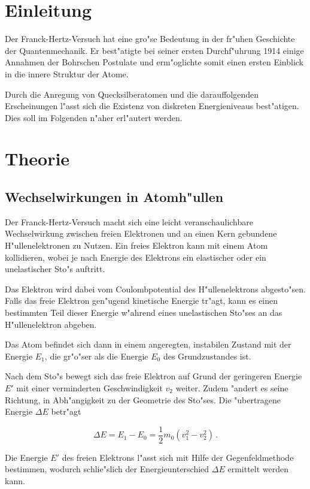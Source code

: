 \section{Einleitung} %
\label{sec:einleitung}
	Der Franck-Hertz-Versuch hat eine gro"se Bedeutung in der fr"uhen Geschichte der Quantenmechanik.
	Er best"atigte bei seiner ersten Durchf"uhrung 1914 einige Annahmen der Bohrschen Postulate und erm"oglichte somit einen ersten Einblick in die innere Struktur der Atome.

	Durch die Anregung von Quecksilberatomen und die darauffolgenden Erscheinungen l"asst sich die Existenz von diskreten Energieniveaus best"atigen.
	Dies soll im Folgenden n"aher erl"autert werden.
	
\section{Theorie} %
\label{sec:theorie}
	\subsection{Wechselwirkungen in Atomh"ullen}
	\label{subsec:ww}
		Der Franck-Hertz-Versuch macht sich eine leicht veranschaulichbare Wechselwirkung zwischen freien Elektronen und an einen Kern gebundene H"ullenelektronen zu Nutzen.
		Ein freies Elektron kann mit einem Atom kollidieren, wobei je nach Energie des Elektrons ein elastischer oder ein unelastischer Sto"s auftritt.

		Das Elektron wird dabei vom Coulombpotential des H"ullenelektrons abgesto"sen.
		Falls das freie Elektron gen"ugend kinetische Energie tr"agt, kann es einen bestimmten Teil dieser Energie w"ahrend eines unelastischen Sto"ses an das H"ullenelektron abgeben.

		Das Atom befindet sich dann in einem angeregten, instabilen Zustand mit der Energie $E_1$, die gr"o"ser als die Energie $E_0$ des Grundzustandes ist.

		Nach dem Sto"s bewegt sich das freie Elektron auf Grund der geringeren Energie $E'$ mit einer verminderten Geschwindigkeit $v_2$ weiter.
		Zudem "andert es seine Richtung, in Abh"angigkeit zu der Geometrie des Sto"ses.
		Die "ubertragene Energie $\Delta E$ betr"agt

		\begin{equation}
			\Delta E = E_1 - E_0 = \frac{1}{2} m_0 \left(v_1^2 - v_2^2\right) \,.
		\end{equation}

		Die Energie $E'$ des freien Elektrons l"asst sich mit Hilfe der Gegenfeldmethode bestimmen, wodurch schlie"slich der Energieunterschied $\Delta E$ ermittelt werden kann.

